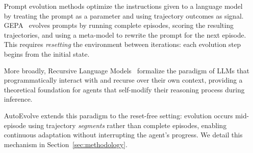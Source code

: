 Prompt evolution methods optimize the instructions given to a language model by treating the prompt as a parameter and using trajectory outcomes as signal. GEPA~\citep{agrawal2025gepa} evolves prompts by running complete episodes, scoring the resulting trajectories, and using a meta-model to rewrite the prompt for the next episode. This requires \emph{resetting} the environment between iterations: each evolution step begins from the initial state.

More broadly, Recursive Language Models~\citep{zhang2025rlm} formalize the paradigm of LLMs that programmatically interact with and recurse over their own context, providing a theoretical foundation for agents that self-modify their reasoning process during inference.

AutoEvolve extends this paradigm to the reset-free setting: evolution occurs mid-episode using trajectory \emph{segments} rather than complete episodes, enabling continuous adaptation without interrupting the agent's progress. We detail this mechanism in Section~\ref{sec:methodology}.
